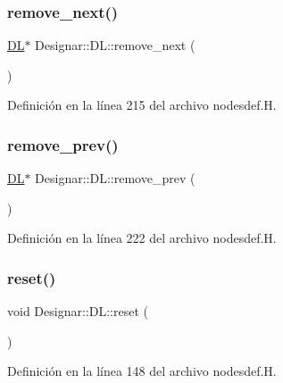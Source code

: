 \subsubsection{\texorpdfstring{remove\+\_\+next()}{remove\_next()}}
{\footnotesize\ttfamily \hyperlink{class_designar_1_1_d_l}{DL}$\ast$ Designar\+::\+D\+L\+::remove\+\_\+next (\begin{DoxyParamCaption}{ }\end{DoxyParamCaption})\hspace{0.3cm}{\ttfamily [inline]}}



Definición en la línea 215 del archivo nodesdef.\+H.

\mbox{\label{class_designar_1_1_d_l_ab1978cfd1b4a98bedb0da473a7ba3164}} 
\subsubsection{\texorpdfstring{remove\+\_\+prev()}{remove\_prev()}}
{\footnotesize\ttfamily \hyperlink{class_designar_1_1_d_l}{DL}$\ast$ Designar\+::\+D\+L\+::remove\+\_\+prev (\begin{DoxyParamCaption}{ }\end{DoxyParamCaption})\hspace{0.3cm}{\ttfamily [inline]}}



Definición en la línea 222 del archivo nodesdef.\+H.

\mbox{\label{class_designar_1_1_d_l_a859e63ccad5bfe211d1fd7396f871091}} 
\subsubsection{\texorpdfstring{reset()}{reset()}}
{\footnotesize\ttfamily void Designar\+::\+D\+L\+::reset (\begin{DoxyParamCaption}{ }\end{DoxyParamCaption})\hspace{0.3cm}{\ttfamily [inline]}}



Definición en la línea 148 del archivo nodesdef.\+H.

